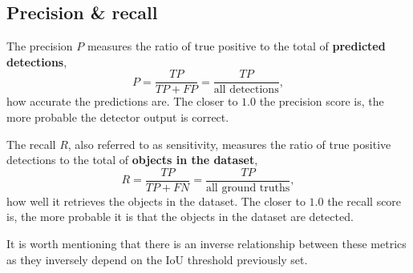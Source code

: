\subsection{Precision \& recall}
%
The precision $P$ measures the ratio of true positive to the total of {\bf predicted detections},
%
\begin{equation}
P = \frac{TP}{TP + FP} = \frac{TP}{\textrm{all detections}},
\label{eq:precision}
\end{equation}
%
\ie how accurate the predictions are.
The closer to $1.0$ the precision score is, the more probable the detector output is correct.


The recall $R$, also referred to as sensitivity, measures the ratio of true positive detections to the total of {\bf objects in the dataset},
%
\begin{equation}
R = \frac{TP}{TP + FN} = \frac{TP}{\textrm{all ground truths}},
\label{eq:recall}
\end{equation}
\ie how well it retrieves the objects in the dataset.
The closer to $1.0$ the recall score is, the more probable it is that the objects in the dataset are detected.

%

It is worth mentioning that there is an inverse relationship between these metrics as they inversely depend on the IoU threshold previously set.

